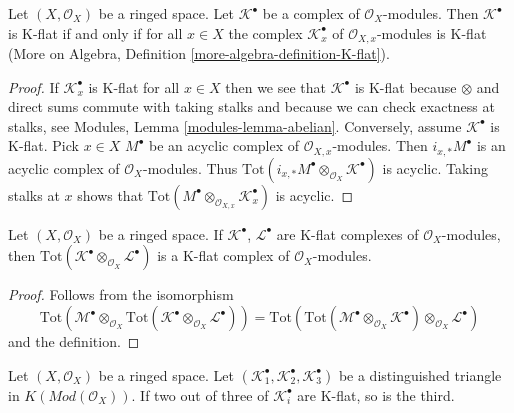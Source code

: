 \begin{lemma}
\label{lemma-check-K-flat-stalks}
Let $(X, \mathcal{O}_X)$ be a ringed space. Let $\mathcal{K}^\bullet$
be a complex of $\mathcal{O}_X$-modules. Then $\mathcal{K}^\bullet$
is K-flat if and only if for all $x \in X$ the complex
$\mathcal{K}_x^\bullet$ of $\mathcal{O}_{X, x}$-modules is K-flat
(More on Algebra, Definition \ref{more-algebra-definition-K-flat}).
\end{lemma}

\begin{proof}
If $\mathcal{K}_x^\bullet$ is K-flat for all $x \in X$ then we see
that $\mathcal{K}^\bullet$ is K-flat because $\otimes$ and
direct sums commute with taking stalks and because we can check exactness
at stalks, see
Modules, Lemma \ref{modules-lemma-abelian}.
Conversely, assume $\mathcal{K}^\bullet$ is K-flat. Pick $x \in X$
$M^\bullet$ be an acyclic complex of $\mathcal{O}_{X, x}$-modules.
Then $i_{x, *}M^\bullet$ is an acyclic complex of $\mathcal{O}_X$-modules.
Thus $\text{Tot}(i_{x, *}M^\bullet \otimes_{\mathcal{O}_X} \mathcal{K}^\bullet)$
is acyclic. Taking stalks at $x$ shows that
$\text{Tot}(M^\bullet \otimes_{\mathcal{O}_{X, x}} \mathcal{K}_x^\bullet)$
is acyclic.
\end{proof}

\begin{lemma}
\label{lemma-tensor-product-K-flat}
Let $(X, \mathcal{O}_X)$ be a ringed space.
If $\mathcal{K}^\bullet$, $\mathcal{L}^\bullet$ are K-flat complexes
of $\mathcal{O}_X$-modules, then
$\text{Tot}(\mathcal{K}^\bullet \otimes_{\mathcal{O}_X} \mathcal{L}^\bullet)$
is a K-flat complex of $\mathcal{O}_X$-modules.
\end{lemma}

\begin{proof}
Follows from the isomorphism
$$
\text{Tot}(\mathcal{M}^\bullet \otimes_{\mathcal{O}_X}
\text{Tot}(\mathcal{K}^\bullet \otimes_{\mathcal{O}_X} \mathcal{L}^\bullet))
=
\text{Tot}(\text{Tot}(\mathcal{M}^\bullet \otimes_{\mathcal{O}_X}
\mathcal{K}^\bullet) \otimes_{\mathcal{O}_X} \mathcal{L}^\bullet)
$$
and the definition.
\end{proof}

\begin{lemma}
\label{lemma-K-flat-two-out-of-three}
Let $(X, \mathcal{O}_X)$ be a ringed space.
Let $(\mathcal{K}_1^\bullet, \mathcal{K}_2^\bullet, \mathcal{K}_3^\bullet)$
be a distinguished triangle in $K(\textit{Mod}(\mathcal{O}_X))$.
If two out of three of $\mathcal{K}_i^\bullet$ are K-flat, so is the third.
\end{lemma}


